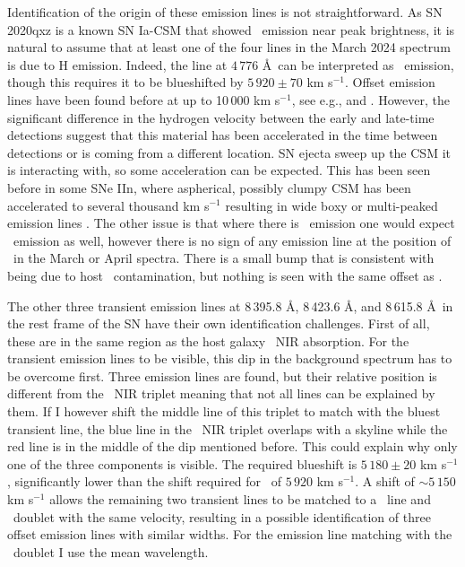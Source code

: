 \documentclass[a4paper,oneside,12pt, class=Latex/Classes/PhDthesisPSnPDF, crop=false]{standalone}
\begin{document}
Identification of the origin of these emission lines is not straightforward. As SN 2020qxz is a known SN Ia-CSM that showed \Halpha\ emission near peak brightness, it is natural to assume that at least one of the four lines in the March 2024 spectrum is due to H emission. Indeed, the line at $4\,776$ \AA~can be interpreted as \Hbeta\ emission, though this requires it to be blueshifted by $5\,920\pm70$ km s$^{-1}$. Offset emission lines have been found before at up to 10\,000 km s$^{-1}$, see e.g., \cite{2019bkc_Chen} and \cite{2019bkc_Prentice}. However, the significant difference in the hydrogen velocity between the early and late-time detections suggest that this material has been accelerated in the time between detections or is coming from a different location. SN ejecta sweep up the CSM it is interacting with, so some acceleration can be expected. This has been seen before in some SNe IIn, where aspherical, possibly clumpy CSM has been accelerated to several thousand km s$^{-1}$ resulting in wide boxy or multi-peaked emission lines \citep{1998S_aspherical_CSM, 1998S_late-time, PTF11iqb}. The other issue is that where there is \Hbeta\ emission one would expect \Halpha\ emission as well, however there is no sign of any emission line at the position of \Halpha\ in the March or April spectra. There is a small bump that is consistent with being due to host \Halpha\ contamination, but nothing is seen with the same offset as \Hbeta. 

The other three transient emission lines at 8\,395.8 \AA,  8\,423.6 \AA, and 8\,615.8 \AA\ in the rest frame of the SN  have their own identification challenges. First of all, these are in the same region as the host galaxy \CaII\ NIR absorption. For the transient emission lines to be visible, this dip in the background spectrum has to be overcome first. Three emission lines are found, but their relative position is different from the \CaII\ NIR triplet meaning that not all lines can be explained by them. If I however shift the middle line of this triplet to match with the bluest transient line, the blue line in the \CaII\ NIR triplet overlaps with a skyline while the red line is in the middle of the dip mentioned before. This could explain why only one of the three components is visible. The required blueshift is $5\,180\pm20$ km s$^{-1}$, significantly lower than the shift required for \Hbeta\ of $5\,920$ km s$^{-1}$. A shift of $\sim5\,150$ km s$^{-1}$ allows the remaining two transient lines to be matched to a \NI\ line and \KI\ doublet with the same velocity, resulting in a possible identification of three offset emission lines with similar widths. For the emission line matching with the \KI\ doublet I use the mean wavelength.
\end{document}

